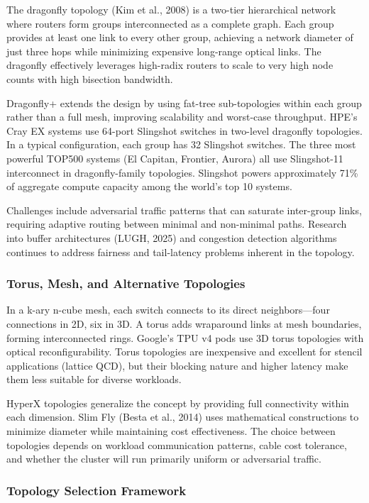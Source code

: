 \documentclass[11pt,letterpaper]{article}
\begin{document}
The dragonfly topology (Kim et al., 2008) is a two-tier hierarchical network where routers form groups interconnected as a complete graph. Each group provides at least one link to every other group, achieving a network diameter of just three hops while minimizing expensive long-range optical links. The dragonfly effectively leverages high-radix routers to scale to very high node counts with high bisection bandwidth.

Dragonfly+ extends the design by using fat-tree sub-topologies within each group rather than a full mesh, improving scalability and worst-case throughput. HPE's Cray EX systems use 64-port Slingshot switches in two-level dragonfly topologies. In a typical configuration, each group has 32 Slingshot switches. The three most powerful TOP500 systems (El Capitan, Frontier, Aurora) all use Slingshot-11 interconnect in dragonfly-family topologies. Slingshot powers approximately 71\% of aggregate compute capacity among the world's top 10 systems.

Challenges include adversarial traffic patterns that can saturate inter-group links, requiring adaptive routing between minimal and non-minimal paths. Research into buffer architectures (LUGH, 2025) and congestion detection algorithms continues to address fairness and tail-latency problems inherent in the topology.

\subsubsection{Torus, Mesh, and Alternative Topologies}

In a k-ary n-cube mesh, each switch connects to its direct neighbors---four connections in 2D, six in 3D. A torus adds wraparound links at mesh boundaries, forming interconnected rings. Google's TPU v4 pods use 3D torus topologies with optical reconfigurability. Torus topologies are inexpensive and excellent for stencil applications (lattice QCD), but their blocking nature and higher latency make them less suitable for diverse workloads.

HyperX topologies generalize the concept by providing full connectivity within each dimension. Slim Fly (Besta et al., 2014) uses mathematical constructions to minimize diameter while maintaining cost effectiveness. The choice between topologies depends on workload communication patterns, cable cost tolerance, and whether the cluster will run primarily uniform or adversarial traffic.

\subsubsection{Topology Selection Framework}
\end{document}
